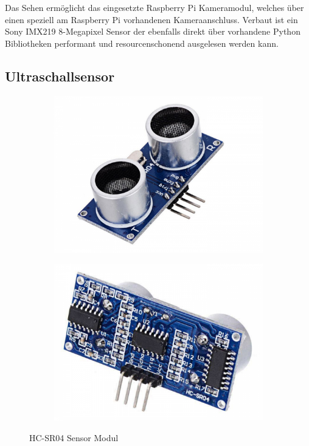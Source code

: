     \noindent
    Das Sehen ermöglicht das eingesetzte Raspberry Pi Kameramodul, welches über
    einen speziell am Raspberry Pi vorhandenen Kameraanschluss. Verbaut ist
    ein Sony IMX219 8-Megapixel Sensor der ebenfalls direkt über vorhandene
    Python Bibliotheken performant und resourcenschonend ausgelesen werden kann.

  \subsection{Ultraschallsensor}

    \begin{figure}[H]
    \center
    \begin{subfigure}{.5\textwidth}
      \centering
      \includegraphics[width=.8\linewidth]{images/hw_hcsr04_01.png}
    \end{subfigure}%
    \begin{subfigure}{.5\textwidth}
      \centering
      \includegraphics[width=.8\linewidth]{images/hw_hcsr04_02.png}
    \end{subfigure}
      \caption{HC-SR04 Sensor Modul}
      \label{fig:img-hw-04}
    \end{figure}
